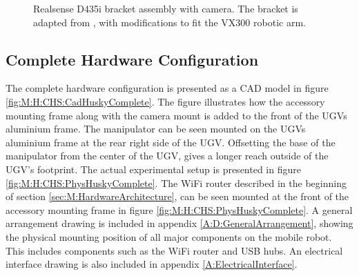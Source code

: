 \begin{figure}[htp!]
\begin{minipage}[b]{0.49\textwidth}
    \caption{Realsense D435i bracket assembly with camera. The bracket is adapted from \cite{d435_sleeve}, with modifications to fit the VX300 robotic arm.}
    \label{fig:realsense_assembly}
  \end{minipage}
\end{figure}


\subsection{Complete Hardware Configuration} \label{sec:M:CompleteHWConfig}
The complete hardware configuration is presented as a CAD model in figure \ref{fig:M:H:CHS:CadHuskyComplete}. The figure illustrates how the accessory mounting frame along with the camera mount is added to the front of the UGVs aluminium frame. The manipulator can be seen mounted on the UGVs aluminium frame at the rear right side of the UGV. Offsetting the base of the manipulator from the center of the UGV, gives a longer reach outside of the UGV's footprint. The actual experimental setup is presented in figure \ref{fig:M:H:CHS:PhysHuskyComplete}. The WiFi router described in the beginning of section \ref{sec:M:HardwareArchitecture}, can be seen mounted at the front of the accessory mounting frame in figure \ref{fig:M:H:CHS:PhysHuskyComplete}. A general arrangement drawing is included in appendix \ref{A:D:GeneralArrangement}, showing the physical mounting position of all major components on the mobile robot. This includes components such as the WiFi router and USB hubs. An electrical interface drawing is also included in appendix \ref{A:ElectricalInterface}.

